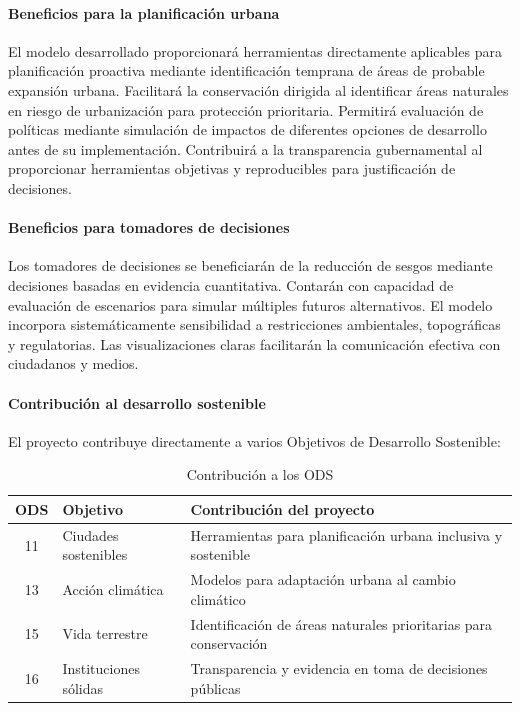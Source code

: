 \paragraph{Beneficios para la planificación urbana}

El modelo desarrollado proporcionará herramientas directamente aplicables para planificación proactiva mediante identificación temprana de áreas de probable expansión urbana. Facilitará la conservación dirigida al identificar áreas naturales en riesgo de urbanización para protección prioritaria. Permitirá evaluación de políticas mediante simulación de impactos de diferentes opciones de desarrollo antes de su implementación. Contribuirá a la transparencia gubernamental al proporcionar herramientas objetivas y reproducibles para justificación de decisiones.

\paragraph{Beneficios para tomadores de decisiones}

Los tomadores de decisiones se beneficiarán de la reducción de sesgos mediante decisiones basadas en evidencia cuantitativa. Contarán con capacidad de evaluación de escenarios para simular múltiples futuros alternativos. El modelo incorpora sistemáticamente sensibilidad a restricciones ambientales, topográficas y regulatorias. Las visualizaciones claras facilitarán la comunicación efectiva con ciudadanos y medios.

\paragraph{Contribución al desarrollo sostenible}

El proyecto contribuye directamente a varios Objetivos de Desarrollo Sostenible:

\begin{table}[h]
\centering
\caption{Contribución a los ODS}
\renewcommand{\arraystretch}{1.3}
\begin{tabular}{@{}clp{8cm}@{}}
\toprule
\textbf{ODS} & \textbf{Objetivo} & \textbf{Contribución del proyecto} \\
\midrule
11 & Ciudades sostenibles & Herramientas para planificación urbana inclusiva y sostenible \\
13 & Acción climática & Modelos para adaptación urbana al cambio climático \\
15 & Vida terrestre & Identificación de áreas naturales prioritarias para conservación \\
16 & Instituciones sólidas & Transparencia y evidencia en toma de decisiones públicas \\
\bottomrule
\end{tabular}
\label{tab:ods_contribution}
\end{table}

